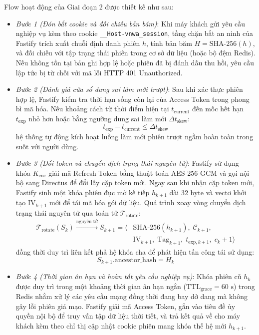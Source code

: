 Flow hoạt động của Giai đoạn 2 được thiết kế như sau:
\begin{itemize}
    \item[-] \textit{Bước 1 (Đón bắt cookie và đối chiếu bản băm)}: Khi máy khách gửi yêu cầu nghiệp vụ kèm theo cookie \texttt{\_\_Host-\allowbreak vnwa\_\allowbreak session}, tầng chặn bắt an ninh của Fastify trích xuất chuỗi định danh phiên $h$, tính bản băm $H = \text{SHA-256}(h)$, và đối chiếu với tập trạng thái phiên trong cơ sở dữ liệu (hoặc bộ đệm Redis). Nếu không tồn tại bản ghi hợp lệ hoặc phiên đã bị đánh dấu thu hồi, yêu cầu lập tức bị từ chối với mã lỗi HTTP 401 Unauthorized.
    \item[-] \textit{Bước 2 (Đánh giá cửa sổ dung sai làm mới trượt)}: Sau khi xác thực phiên hợp lệ, Fastify kiểm tra thời hạn sống còn lại của Access Token trong phong bì mã hóa. Nếu khoảng cách từ thời điểm hiện tại $t_{\text{current}}$ đến mốc hết hạn $t_{\text{exp}}$ nhỏ hơn hoặc bằng ngưỡng dung sai làm mới $\Delta t_{\text{skew}}$:
    \begin{equation}
    \label{eq:sliding_skew_vi}
    t_{\text{exp}} - t_{\text{current}} \le \Delta t_{\text{skew}}
    \end{equation}
    hệ thống tự động kích hoạt luồng làm mới phiên trượt ngầm hoàn toàn trong suốt với người dùng.
    \item[-] \textit{Bước 3 (Đổi token và chuyển dịch trạng thái nguyên tử)}: Fastify sử dụng khóa $K_{\text{enc}}$ giải mã Refresh Token bằng thuật toán AES-256-GCM và gọi nội bộ sang Directus để đổi lấy cặp token mới. Ngay sau khi nhận cặp token mới, Fastify sinh một khóa phiên đục mờ kế tiếp $h_{k+1}$ dài 32 byte và vectơ khởi tạo $\text{IV}_{k+1}$ mới để tái mã hóa gói dữ liệu. Quá trình xoay vòng chuyển dịch trạng thái nguyên tử qua toán tử $\mathcal{T}_{\text{rotate}}$:
    \begin{equation}
    \label{eq:rotate_session_vi}
    \begin{aligned}
    \mathcal{T}_{\text{rotate}}(S_k) \xrightarrow{\text{nguyên tử}} S_{k+1} = \big\langle & \text{SHA-256}(h_{k+1}),\; \mathcal{C}_{k+1}, \\
    & \text{IV}_{k+1},\; \text{Tag}_{k+1},\; t_{\text{exp}, k+1},\; c_k + 1 \big\rangle
    \end{aligned}
    \end{equation}
    đồng thời duy trì liên kết phả hệ khóa cha để phát hiện tấn công tái sử dụng:
    \begin{equation}
    \label{eq:rotate_lineage_vi}
    S_{k+1}.\text{ancestor\_hash} = H_k
    \end{equation}
    \item[-] \textit{Bước 4 (Thời gian ân hạn và hoàn tất yêu cầu nghiệp vụ)}: Khóa phiên cũ $h_k$ được duy trì trong một khoảng thời gian ân hạn ngắn ($\text{TTL}_{\text{grace}} = 60\text{ s}$) trong Redis nhằm xử lý các yêu cầu mạng đồng thời đang bay dở dang mà không gây lỗi phiên giả mạo. Fastify giải mã Access Token, gắn vào tiêu đề ủy quyền nội bộ để truy vấn tập dữ liệu thời tiết, và trả kết quả về cho máy khách kèm theo chỉ thị cập nhật cookie phiên mang khóa thế hệ mới $h_{k+1}$.
\end{itemize}

